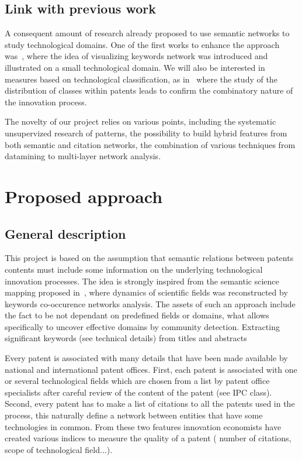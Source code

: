 \subsection{Link with previous work}


A consequent amount of research already proposed to use semantic networks to study technological domains. One of the first works to enhance the approach was~\cite{yoon2004text}, where the idea of visualizing keywords network was introduced and illustrated on a small technological domain. We will also be interested in measures based on technological classification, as in~\cite{Youn:2015fk} where the study of the distribution of classes within patents leads to confirm the combinatory nature of the innovation process.

The novelty of our project relies on various points, including the systematic unsupervized research of patterns, the possibility to build hybrid features from both semantic and citation networks, the combination of various techniques from datamining to multi-layer network analysis.



\section{Proposed approach}

\subsection{General description}

This project is based on the assumption that semantic relations between patents contents must include some information on the underlying technological innovation processes. The idea is strongly inspired from the semantic science mapping proposed in~\cite{chavalarias2013phylomemetic}, where dynamics of scientific fields was reconstructed by keywords co-occurence networks analysis. The assets of such an approach include the fact to be not dependant on predefined fields or domains, what allows specifically to uncover effective domains by community detection. Extracting significant keywords (see technical details) from titles and abstracts

Every patent is associated with many details that have been made available by national and international patent offices. First, each patent is associated with one or several technological fields which are chosen from a list by patent office specialists after careful review of the content of the patent (see IPC class). Second, every patent has to make a list of citations to all the patents used in the process, this naturally define a network between entities that have some technologies in common. From these two features innovation economists have created various indices to measure the quality of a patent ( number of citations, scope of technological field...).

